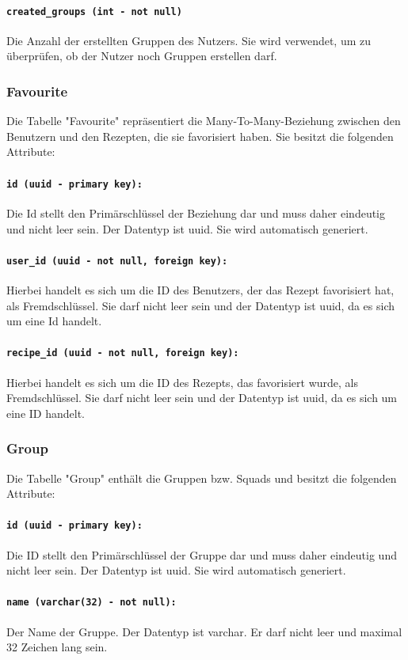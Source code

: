 \documentclass{entwurfsheft}
\begin{document}
\begin{sloppypar}
\paragraph{\texttt{created\_groups (int - not null)}}
Die Anzahl der erstellten Gruppen des Nutzers. Sie wird verwendet, um zu überprüfen, ob der Nutzer noch Gruppen erstellen darf.
\newpage
\subsubsection{Favourite}
Die Tabelle "Favourite" repräsentiert die Many-To-Many-Beziehung zwischen den Benutzern und den Rezepten, die sie favorisiert haben. Sie besitzt die folgenden Attribute:
\paragraph{\texttt{id (uuid - primary key):}} Die Id stellt den Primärschlüssel der Beziehung dar und muss daher eindeutig und nicht leer sein. Der Datentyp ist \Gls{uuid}. Sie wird automatisch generiert.
\paragraph{\texttt{user\_id (uuid - not null, foreign key):}} Hierbei handelt es sich um die ID des Benutzers, der das Rezept favorisiert hat, als Fremdschlüssel. Sie darf nicht leer sein und der Datentyp ist \Gls{uuid}, da es sich um eine Id handelt.
\paragraph{\texttt{recipe\_id (uuid - not null, foreign key):}} Hierbei handelt es sich um die ID des Rezepts, das favorisiert wurde, als Fremdschlüssel. Sie darf nicht leer sein und der Datentyp ist \Gls{uuid}, da es sich um eine ID handelt.
\newpage
\subsubsection{Group}
Die Tabelle "Group" enthält die Gruppen bzw. Squads und besitzt die folgenden Attribute:
\paragraph{\texttt{id (uuid - primary key):}} Die ID stellt den Primärschlüssel der Gruppe dar und muss daher eindeutig und nicht leer sein. Der Datentyp ist \Gls{uuid}. Sie wird automatisch generiert.
\paragraph{\texttt{name (varchar(32) - not null):}} Der Name der Gruppe. Der Datentyp ist \Gls{varchar}. Er darf nicht leer und maximal 32 Zeichen lang sein.
\newpage

\end{sloppypar}
\end{document}
